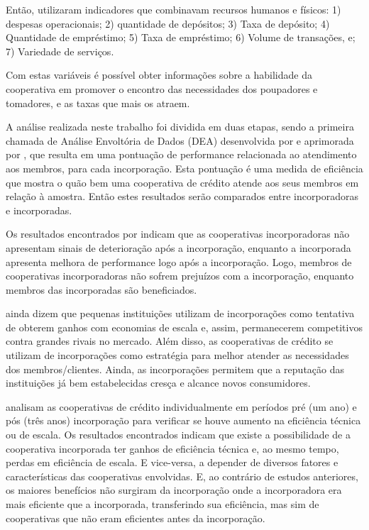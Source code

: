 \documentclass[ppgcc]{fearp}
\begin{document}
Então, utilizaram indicadores que combinavam recursos humanos e físicos: 1) despesas operacionais; 2) quantidade de depósitos; 3) Taxa de depósito; 4) Quantidade de empréstimo; 5) Taxa de empréstimo; 6) Volume de transações, e; 7) Variedade de serviços.

Com estas variáveis é possível obter informações sobre a habilidade da cooperativa em promover o encontro das necessidades dos poupadores e tomadores, e as taxas que mais os atraem. 

A análise realizada neste trabalho foi dividida em duas etapas, sendo a primeira chamada de Análise Envoltória de Dados (DEA) desenvolvida por  e aprimorada por , que resulta em uma pontuação de performance relacionada ao atendimento aos membros, para cada incorporação. Esta pontuação é uma medida de eficiência que mostra o quão bem uma cooperativa de crédito atende aos seus membros em relação à amostra. Então estes resultados serão comparados entre incorporadoras e incorporadas. 

Os resultados encontrados por  indicam que as cooperativas incorporadoras não apresentam sinais de deterioração após a incorporação, enquanto a incorporada apresenta melhora de performance logo após a incorporação. Logo, membros de cooperativas incorporadoras não sofrem prejuízos com a incorporação, enquanto membros das incorporadas são beneficiados.

 ainda dizem que pequenas instituições utilizam de incorporações como tentativa de obterem ganhos com economias de escala e, assim, permanecerem competitivos contra grandes rivais no mercado. Além disso, as cooperativas de crédito se utilizam de incorporações como estratégia para melhor atender as necessidades dos membros/clientes. Ainda, as incorporações permitem que a reputação das instituições já bem estabelecidas cresça e alcance novos consumidores.

  analisam as cooperativas de crédito individualmente em períodos pré (um ano) e pós (três anos) incorporação para verificar se houve aumento na eficiência técnica ou de escala. Os resultados encontrados indicam que existe a possibilidade de a cooperativa incorporada ter ganhos de eficiência técnica e, ao mesmo tempo, perdas em eficiência de escala. E vice-versa, a depender de diversos fatores e características das cooperativas envolvidas. E, ao contrário de estudos anteriores, os maiores benefícios não surgiram da incorporação onde a incorporadora era mais eficiente que a incorporada, transferindo sua eficiência, mas sim de cooperativas que não eram eficientes antes da incorporação.
\end{document}
